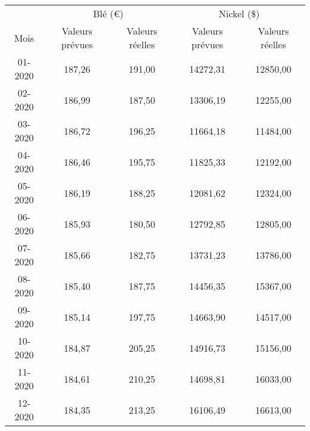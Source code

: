 \begin{tabular}{ccccc}
      \toprule
      & \multicolumn{2}{c}{Blé (\euro)} & \multicolumn{2}{c}{Nickel (\$)} \\
       Mois  & Valeurs prévues & Valeurs réelles & Valeurs prévues & Valeurs réelles \\
      \cmidrule(r){1-1}\cmidrule(lr){2-3}\cmidrule(lr){4-5}
01-2020 & 187,26 & 191,00 & 14272,31 & 12850,00 \\
02-2020 & 186,99 & 187,50 & 13306,19 & 12255,00 \\
03-2020 & 186,72 & 196,25 & 11664,18 & 11484,00 \\
04-2020 & 186,46 & 195,75 & 11825,33 & 12192,00 \\
05-2020 & 186,19 & 188,25 & 12081,62 & 12324,00 \\
06-2020 & 185,93 & 180,50 & 12792,85 & 12805,00 \\
07-2020 & 185,66 & 182,75 & 13731,23 & 13786,00 \\
08-2020 & 185,40 & 187,75 & 14456,35 & 15367,00 \\
09-2020 & 185,14 & 197,75 & 14663,90 & 14517,00 \\
10-2020 & 184,87 & 205,25 & 14916,73 & 15156,00 \\
11-2020 & 184,61 & 210,25 & 14698,81 & 16033,00 \\
12-2020 & 184,35 & 213,25 & 16106,49 & 16613,00 \\
\bottomrule
\end{tabular}%
